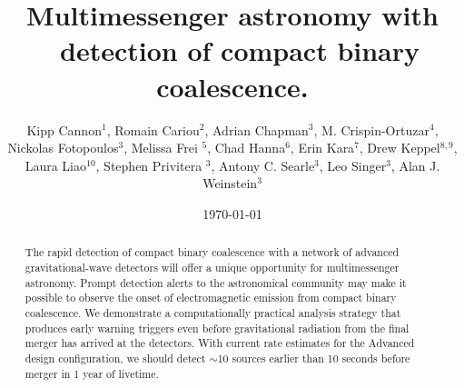 \documentclass[showpacs,groupedaddress,showkeys,preprintnumbers]{iopart}
\begin{document}
\title[LLOID]{Multimessenger astronomy with \earlywarning\ detection of compact binary coalescence.}



\date{\today}

\author{Kipp Cannon$^{1}$, Romain Cariou$^{2}$, Adrian Chapman$^3$, M.
Crispin-Ortuzar$^4$, Nickolas Fotopoulos$^3$, Melissa Frei $^5$, Chad
Hanna$^{6}$, Erin Kara$^{7}$, Drew Keppel$^{8,9}$, Laura Liao$^{10}$, Stephen
Privitera $^3$, Antony C.  Searle$^3$, Leo Singer$^3$, Alan J.  Weinstein$^3$}

\address{$^1$ Canadian Institute for Theoretical Astrophysics, Toronto, ON,
Canada}
\address{$^2$  D\'{e}partement de physique, \'{E}cole Normale Sup\'{e}rieure de Cachan, 61
Avenue du Pr\'{e}sident Wilson, 94235 Cachan Cedex, France}
\address{$^3$ LIGO Laboratory - California Institute of Technology, Pasadena,
CA, USA} 
\address{$^4$ Facultat de Física, Universitat de València, E-46100 Burjassot,
Spain} 
\address{$^5$ The University of Texas at Austin, Austin, TX, USA}
\address{$^6$ Perimeter Institute for Theoretical Physics, Waterloo, ON,
Canada} 
\address{$^7$ Department of Physics and Astronomy, Barnard College, Columbia
University, New York, NY 10027, USA} 
\address{$^8$ Albert-Einstein-Institut, Max-Planck-Institut f\"{u}r
Gravitationphysik, Hannover, Germany} 
\address{$^9$ Leibniz Universit\"{a}t Hannover, Hannover, Germany}
\address{$^{10}$ Ryerson University, Toronto, ON, Canada}

\begin{abstract}
The rapid detection of compact binary coalescence with a network of advanced
gravitational-wave detectors will offer a unique opportunity for multimessenger astronomy.  Prompt detection alerts to the astronomical community may make it possible to observe the onset of electromagnetic emission from compact binary coalescence.  We demonstrate a computationally practical analysis strategy that produces early warning triggers even before gravitational radiation from the final merger has arrived at the detectors.  With current rate estimates for the Advanced \LIGO{} design configuration, we should detect $\sim$10 sources earlier than 10 seconds before merger in 1 year of livetime.
\end{abstract}


\end{document}
